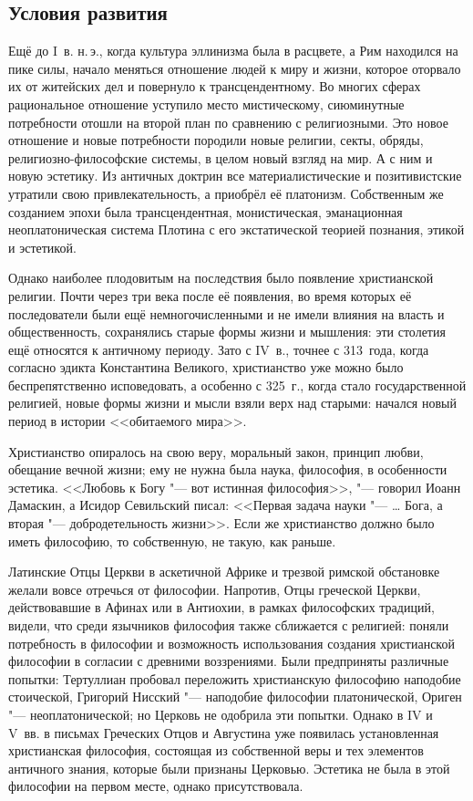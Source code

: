 \subsection{Условия развития}
 Ещё до I~в. н.\,э., когда культура эллинизма была в расцвете, а Рим находился на пике силы, начало меняться отношение людей к миру и жизни, которое оторвало их от житейских дел и повернуло к трансцендентному. Во многих сферах рациональное отношение уступило место мистическому, сиюминутные потребности отошли на второй план по сравнению с религиозными. Это новое отношение и новые потребности породили новые религии, секты, обряды, религиозно-философские системы, в целом новый взгляд на мир. А с ним и новую эстетику. Из античных доктрин все материалистические и позитивистские утратили свою привлекательность, а приобрёл её платонизм. Собственным же созданием эпохи была трансцендентная, монистическая, эманационная неоплатоническая система Плотина с его экстатической теорией познания, этикой и эстетикой. 

Однако наиболее плодовитым на последствия было появление христианской религии. Почти через три века после её появления, во время которых её последователи были ещё немногочисленными и не имели влияния на власть и общественность, сохранялись старые формы жизни и мышления: эти столетия ещё относятся к античному периоду. Зато с IV~в., точнее с 313~года, когда согласно эдикта Константина Великого, христианство уже можно было беспрепятственно исповедовать, а особенно с 325~г., когда стало государственной религией, новые формы жизни и мысли взяли верх над старыми: начался новый период в истории <<обитаемого мира>>. 

Христианство опиралось на свою веру, моральный закон, принцип любви, обещание вечной жизни; ему не нужна была наука, философия, в особенности эстетика. <<Любовь к Богу "--- вот истинная философия>>, "--- говорил Иоанн Дамаскин, а Исидор Севильский писал: <<Первая задача науки "--- … Бога, а вторая "--- добродетельность жизни>>. Если же христианство должно было иметь философию, то собственную, не такую, как раньше.

Латинские Отцы Церкви в аскетичной Африке и трезвой римской обстановке желали вовсе отречься от философии. Напротив, Отцы греческой Церкви, действовавшие в Афинах или в Антиохии, в рамках философских традиций, видели, что среди язычников философия также сближается с религией: поняли потребность в философии и возможность использования создания христианской философии в согласии с древними воззрениями. Были предприняты различные попытки: Тертуллиан пробовал переложить христианскую философию наподобие стоической, Григорий Нисский "--- наподобие философии платонической, Ориген "--- неоплатонической; но Церковь не одобрила эти попытки. Однако в IV и V~вв. в письмах Греческих Отцов и Августина уже появилась установленная христианская философия, состоящая из собственной веры и тех элементов античного знания, которые были признаны Церковью. Эстетика не была в этой философии на первом месте, однако присутствовала.

